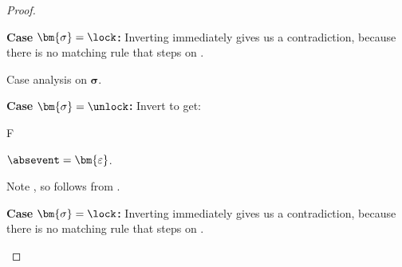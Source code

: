 \documentclass[a4paper,names,dvipsnames]{article}
\begin{document}
\begin{proof}
\begin{description}
\begin{description}
\begin{description}
            \item \textbf{Case }$\bm{\sigma}=\lock$\textbf{:}
              Inverting  immediately gives us a contradiction, because there is no matching rule that steps on \lock.
          \end{description}

          Case analysis on $\bm{\sigma}$.
          \begin{description}
            \item \textbf{Case }$\bm{\sigma}=\unlock$\textbf{:}
              Invert  to get:
              \begin{passumptions}{F}
                \item $\absevent=\bm{\varepsilon}$.
              \end{passumptions}
              Note , so  follows from .

            \item \textbf{Case }$\bm{\sigma}=\lock$\textbf{:}
              Inverting  immediately gives us a contradiction, because there is no matching rule that steps on \lock.
          \end{description}
      \end{description}
  \end{description}
\end{proof}
\end{document}
